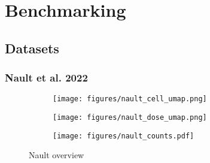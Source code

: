 \chapter{Benchmarking}
\label{ch:chapter1}

\clearpage


\section{Datasets}

\subsection{Nault et al. 2022}

\begin{figure}[h]
    \centering
    \begin{subfigure}[t]{0.49\textwidth}
        \centering
        \texttt{[image: figures/nault\_cell\_umap.png]}
        \caption{}
        \label{fig:figure1}
    \end{subfigure}%
    \hfill
    \begin{subfigure}[t]{0.49\textwidth}
        \centering
        \texttt{[image: figures/nault\_dose\_umap.png]}
        \caption{}
        \label{fig:figure2}
    \end{subfigure}%
    \hfill
    \begin{subfigure}[b]{\textwidth}
        \centering
        \texttt{[image: figures/nault\_counts.pdf]}
        \caption{}
        \label{fig:figure3}
    \end{subfigure}
    \caption{Nault overview}
    \label{fig:combined}
\end{figure}



